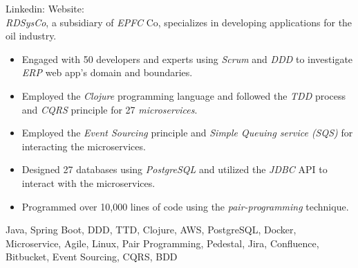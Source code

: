\begin{experiences}
{
  Linkedin: 
  Website: \\
  \emph{RDSysCo}, a subsidiary of \emph{EPFC} Co, specializes in developing applications for the oil industry.
  \begin{itemize}
  \item Engaged with 50 developers and experts using \emph{Scrum} and \emph{DDD} to investigate \textit{ERP} web app's domain and boundaries.
  \item Employed the \emph{Clojure} programming language and followed the \emph{TDD} process and \textit{CQRS} principle for 27 \emph{microservices}.
  \item Employed the \textit{Event Sourcing} principle and \textit{Simple Queuing service (SQS)} for interacting the microservices.
  \item Designed 27 databases using \emph{PostgreSQL} and utilized the \emph{JDBC} API to interact with the microservices.
  \item Programmed over 10,000 lines of code using the \emph{pair-programming} technique.
  \end{itemize}
  }
  {Java, Spring Boot, DDD, TTD, Clojure, AWS, PostgreSQL, Docker, Microservice, Agile, Linux, Pair Programming, Pedestal, Jira, Confluence, Bitbucket, Event Sourcing, CQRS, BDD}
  
 \emptySeparator
  

\end{experiences}

